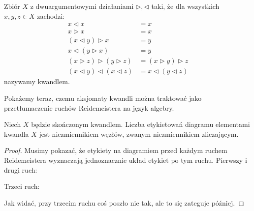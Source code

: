 \begin{definition}
    Zbiór $X$ z dwuargumentowymi działaniami $\triangleright, \triangleleft$ taki, że dla wszystkich $x, y, z \in X$ zachodzi:
    \begin{align}
    x \triangleleft x & = x \\
    x \triangleright x & = x \\
    (x \triangleleft y) \triangleright x & = y \\
    x \triangleleft (y \triangleright x) & = y \\
     (x \triangleright z) \triangleright (y \triangleright z) & = (x \triangleright y) \triangleright z \\
    (x \triangleleft y) \triangleleft (x \triangleleft z) & = x \triangleleft (y \triangleleft z)
    \end{align}
    nazywamy kwandlem.
\end{definition}

Pokażemy teraz, czemu aksjomaty kwandli można traktować jako przetłumaczenie ruchów Reidemeistera na język algebry.
%

\begin{proposition}
%
    Niech $X$ będzie skończonym kwandlem.
    Liczba etykietowań diagramu elementami kwandla $X$ jest niezmiennikiem węzłów, zwanym niezmiennikiem zliczającym.
\end{proposition}

\begin{proof}
    Musimy pokazać, że etykiety na diagramiem przed każdym ruchem Reidemeistera wyznaczają jednoznacznie układ etykiet po tym ruchu.
    Pierwszy i drugi ruch:
\begin{comment}
    \begin{figure}[H]
        \begin{minipage}[b]{.48\linewidth}
        \[
            \MedLarReidemeisterOneRightQuandleProof
            \stackrel{R_1}{\cong}
            \MedLarReidemeisterOneStraightQuandleProof
        \]
        \end{minipage}
        \begin{minipage}[b]{.48\linewidth}
        \[
            \MedLarReidemeisterTwoQuandleA \cong \MedLarReidemeisterTwoQuandleB
        \]
        \end{minipage}
    \end{figure}
\end{comment}
\noindent
Trzeci ruch:
\begin{comment}
    \[
        \LargeReidemeisterThreeQuandleA \cong \LargeReidemeisterThreeQuandleB \qedhere
    \]
\end{comment}
\noindent
Jak widać, przy trzecim ruchu coś poszło nie tak, ale to się zateguje później.
\end{proof}

